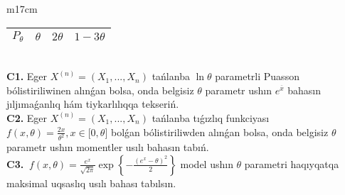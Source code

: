 \documentclass{article}
\begin{document}
\begin{tabular}{m{17cm}}
\begin{tabular}{|c|c|c|c|}
\hline
\(P_{\theta}\) & \(\theta\) & \(2\theta\) & \(1 - 3\theta\) \\
\hline
\end{tabular}
 \\
\textbf{C1.} 
Eger \(X^{(n)} = \left( X_{1},...,X_{n} \right)\) tańlanba \(\ln\theta\) parametrli Puasson bólistiriliwinen alınǵan bolsa, onda belgisiz \(\theta\) parametr ushın \(e^{\overline{x}}\) bahasın jıljımaǵanlıq hám tiykarlılıqqa tekseriń.
 \\
\textbf{C2.} 
Eger \(X^{(n)} = \left( X_{1},...,X_{n} \right)\) tańlanba tıǵızlıq funkciyası
$f(x,\theta) = \frac{2x}{\theta^{2}},x \in \lbrack 0,\theta\rbrack$
bolǵan bólistiriliwden alınǵan bolsa, onda belgisiz \(\theta\) parametr ushın momentler usılı bahasın tabıń.
 \\
\textbf{C3.} 
\(\ f(x,\theta) = \frac{e^{x}}{\sqrt{2\pi}}\exp\left\{ - \frac{\left( e^{x} - \theta \right)^{2}}{2} \right\}\) model ushın \(\theta\) parametri haqıyqatqa maksimal uqsaslıq usılı bahası tabılsın.
 \\

\end{tabular}
\vspace{1cm}
\end{document}
